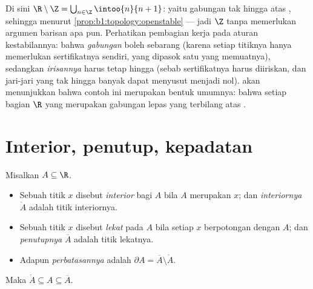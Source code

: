 \begin{example}\label{ex:b1:topology:rminusz}
Di sini $\R \setminus \Z = \bigcup_{n \in \Z} \intoo{n}{n+1}$: yaitu
gabungan tak hingga atas  , sehingga  menurut
\cref{prop:b1:topology:openstable} --- jadi $\Z$  tanpa
memerlukan argumen barisan apa pun. Perhatikan pembagian kerja pada
aturan kestabilannya: bahwa \emph{gabungan}  boleh sebarang
(karena setiap titiknya hanya memerlukan sertifikatnya sendiri, yang dipasok satu
 yang memuatnya), sedangkan \emph{irisannya} harus tetap hingga
(sebab sertifikatnya harus diiriskan, dan jari-jari yang tak hingga banyak dapat
menyusut menjadi nol).  akan menunjukkan bahwa contoh
ini merupakan bentuk umumnya: bahwa setiap  bagian $\R$ yang  merupakan
gabungan lepas yang terbilang atas  .
\end{example}

\section{Interior, penutup, kepadatan}

\begin{definition}\label{def:b1:topology:closure}
Misalkan $A \subseteq \R$.
\begin{itemize}
  \item Sebuah titik $x$ disebut \emph{interior} bagi $A$ bila $A$ merupakan
         $x$; dan \emph{interiornya}
        $\mathring{A}$ adalah  titik interiornya.
  \item Sebuah titik $x$ disebut \emph{lekat} pada $A$ bila setiap 
        $x$ berpotongan dengan $A$; dan \emph{penutupnya}
        $\overline{A}$ adalah  titik lekatnya.
  \item Adapun \emph{perbatasannya} adalah $\partial A = \overline A \setminus
        \mathring A$.
\end{itemize}
Maka $\mathring A \subseteq A \subseteq \overline A$.
\end{definition}

